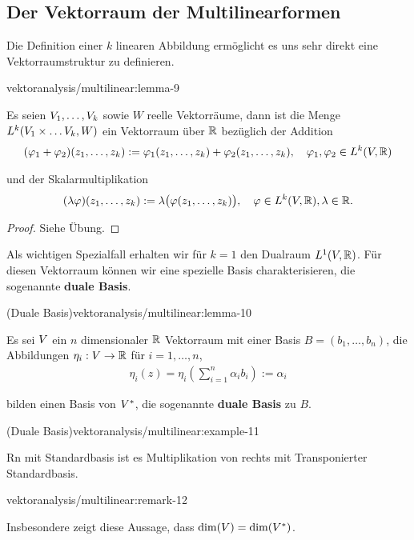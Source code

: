 \subsection{Der Vektorraum der Multilinearformen}
\label{\detokenize{vektoranalysis/multilinear:der-vektorraum-der-multilinearformen}}
\par
Die Definition einer \(k\) linearen Abbildung ermöglicht es uns sehr direkt eine Vektorraumstruktur zu definieren.
\begin{lemma}{}{vektoranalysis/multilinear:lemma-9}



\par
Es seien \(V_1,\ldots,V_k\) sowie \(W\) reelle Vektorräume, dann ist die Menge \(L^k(V_1\times\ldots V_k,W)\) ein Vektorraum über \(\mathbb{R}\) bezüglich der Addition
\begin{align*}
(\varphi_1+\varphi_2)(z_1,\ldots,z_k) := \varphi_1(z_1,\ldots,z_k) +
\varphi_2(z_1,\ldots,z_k),\quad \varphi_1,\varphi_2\in L^k(V,\mathbb{R})
\end{align*}
\par
und der Skalarmultiplikation
\begin{align*}
(\lambda\varphi)(z_1,\ldots,z_k) := \lambda\big(\varphi(z_1,\ldots,z_k)\big),\quad\varphi\in L^k(V,\mathbb{R}), \lambda\in\mathbb{R}.
\end{align*}\end{lemma}

\begin{proof}
 Siehe Übung.
\end{proof}

\par
Als wichtigen Spezialfall erhalten wir für \(k=1\) den Dualraum \(L^1(V,\mathbb{R})\). Für diesen Vektorraum können wir eine spezielle Basis charakterisieren, die sogenannte \textbf{duale Basis}.
\begin{lemma}{(Duale Basis)}{vektoranalysis/multilinear:lemma-10}



\par
Es sei \(V\) ein \(n\) dimensionaler \(\mathbb{R}\) Vektorraum mit einer Basis \(B = (b_1,\ldots,b_n)\), die Abbildungen
\(\eta_i:V\rightarrow\mathbb{R}\) für \(i=1,\ldots,n\),
\begin{align*}
\eta_i(z) = \eta_i\left(\sum_{i=1}^n \alpha_i b_i\right) := \alpha_i
\end{align*}
\par
bilden einen Basis von \(V^\ast\), die sogenannte \textbf{duale Basis} zu \(B\).
\end{lemma}
\begin{example}{(Duale Basis)}{vektoranalysis/multilinear:example-11}



\par
Rn mit Standardbasis ist es Multiplikation von rechts mit Transponierter Standardbasis.
\end{example}
\begin{remark}{}{vektoranalysis/multilinear:remark-12}



\par
Insbesondere zeigt diese Aussage, dass \(\dim(V) = \dim(V^\ast)\).
\end{remark}

